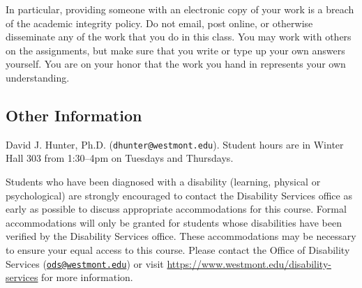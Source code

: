 \documentclass[
  twoside]{article}
\begin{document}
In particular, providing someone with an electronic copy of your work is
a breach of the academic integrity policy. Do not email, post online, or
otherwise disseminate any of the work that you do in this class. You may
work with others on the assignments, but make sure that you write or
type up your own answers yourself. You are on your honor that the work
you hand in represents your own understanding.

\hypertarget{other-information}{%
\subsection{Other Information}\label{other-information}}

\begin{description} \small

\item[Professor:] David J. Hunter, Ph.D.
  (\verb!dhunter@westmont.edu!). Student hours are in Winter Hall 303 
  from 1:30--4pm on Tuesdays and Thursdays.

\item[Accommodations for Students with Disabilities:] Students who have been diagnosed with a disability (learning, physical or psychological) are strongly encouraged to contact the Disability Services office as early as possible to discuss appropriate accommodations for this course. Formal accommodations will only be granted for students whose disabilities have been verified by the Disability Services office.  These accommodations may be necessary to ensure your equal access to this course.  Please contact the Office of Disability Services (\href{mailto:ods@westmont.edu}{\tt ods@westmont.edu}) or visit \url{https://www.westmont.edu/disability-services} for more information.


\end{description}
\end{document}

